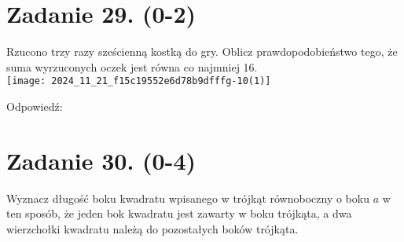 \documentclass[10pt]{article}
\begin{document}
\section*{Zadanie 29. (0-2)}
Rzucono trzy razy sześcienną kostką do gry. Oblicz prawdopodobieństwo tego, że suma wyrzuconych oczek jest równa co najmniej 16.\\
\texttt{[image: 2024\_11\_21\_f15c19552e6d78b9dfffg-10(1)]}

Odpowiedź:

\section*{Zadanie 30. (0-4)}
Wyznacz długość boku kwadratu wpisanego w trójkąt równoboczny o boku \(a\) w ten sposób, że jeden bok kwadratu jest zawarty w boku trójkąta, a dwa wierzchołki kwadratu należą do pozostałych boków trójkąta.
\end{document}
